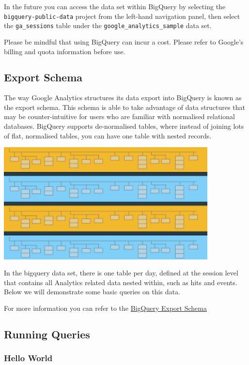 \documentclass[]{book}
\begin{document}
In the future you can access the data set within BigQuery by selecting the
\texttt{bigquery-public-data} project from the left-hand navigation panel, then
select the \texttt{ga\_sessions} table under the \texttt{google\_analytics\_sample} data set.

Please be mindful that using BigQuery can incur a cost. Please refer to Google's
billing and quota information before use.

\hypertarget{export-schema}{%
\subsection{Export Schema}\label{export-schema}}

The way Google Analytics structures its data export into BigQuery is known
as the export schema. This schema is able to take advantage of data structures
that may be counter-intuitive for users who are familiar with normalised relational
databases. BigQuery supports de-normalised tables, where instead of joining lots
of flat, normalised tables, you can have one table with nested records.

\includegraphics[width=4.37in]{img/bqexport}

In the bigquery data set, there is one table per day, defined at the session level
that contains all Analytics related data nested within, such as hits and events.
Below we will demonstrate some basic queries on this data.

For more information you can refer to the \href{https://support.google.com/analytics/answer/3437719?hl=en\&ref_topic=3416089\#}{BigQuery Export Schema}

\hypertarget{running-queries}{%
\subsection{Running Queries}\label{running-queries}}

\hypertarget{hello-world}{%
\subsubsection{Hello World}\label{hello-world}}
\end{document}
